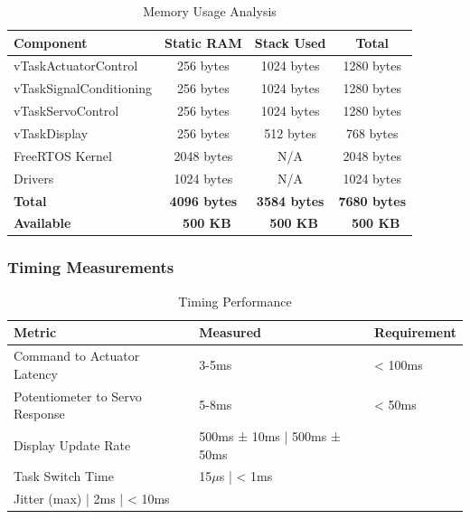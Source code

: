 \documentclass[12pt]{article}
\begin{document}
\begin{table}[H]
	\centering
	\caption{Memory Usage Analysis}
	\label{tab:memory-usage}
	\begin{tabular}{|l|c|c|c|}
		\hline
		\textbf{Component} & \textbf{Static RAM} & \textbf{Stack Used} & \textbf{Total} \\
		\hline
		vTaskActuatorControl & 256 bytes & 1024 bytes & 1280 bytes \\
		\hline
		vTaskSignalConditioning & 256 bytes & 1024 bytes & 1280 bytes \\
		\hline
		vTaskServoControl & 256 bytes & 1024 bytes & 1280 bytes \\
		\hline
		vTaskDisplay & 256 bytes & 512 bytes & 768 bytes \\
		\hline
		FreeRTOS Kernel & 2048 bytes & N/A & 2048 bytes \\
		\hline
		Drivers & 1024 bytes & N/A & 1024 bytes \\
		\hline
		\textbf{Total} & \textbf{4096 bytes} & \textbf{3584 bytes} & \textbf{7680 bytes} \\
		\hline
		\textbf{Available} & \textbf{~500 KB} & \textbf{~500 KB} & \textbf{~500 KB} \\
		\hline
	\end{tabular}
\end{table}

\subsubsection*{Timing Measurements}

\begin{table}[H]
	\centering
	\caption{Timing Performance}
	\label{tab:timing-performance}
	\begin{tabular}{|l|l|l|}
		\hline
		\textbf{Metric} & \textbf{Measured} & \textbf{Requirement} \\
		\hline
		Command to Actuator Latency & 3-5ms & < 100ms \\
		\hline
		Potentiometer to Servo Response & 5-8ms & < 50ms \\
		\hline
		Display Update Rate & 500ms ± 10ms | 500ms ± 50ms \\
		\hline
		Task Switch Time & 15$\mu$s | < 1ms \\
		\hline
		Jitter (max) | 2ms | < 10ms \\
		\hline
	\end{tabular}
\end{table}

\end{document}
